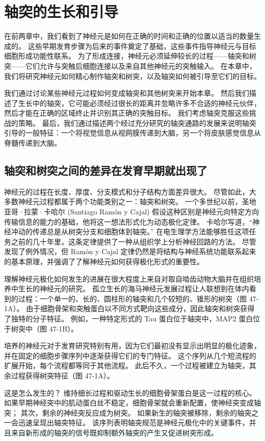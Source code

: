 \chapter{轴突的生长和引导}
在前两章中，我们看到了神经元是如何在正确的时间和正确的位置以适当的数量生成的。 这些早期发育步骤为后来的事件奠定了基础，这些事件指导神经元与目标细胞形成功能性联系。 为了形成连接，神经元必须延伸较长的过程——轴突和树突——它们允许与突触后细胞连接以及来自其他神经元的突触输入。 在本章中，我们将研究神经元如何精心制作轴突和树突，以及轴突如何被引导至它们的目标。

我们通过讨论某些神经元过程如何变成轴突和其他树突来开始本章。 然后我们描述了生长中的轴突，它可能必须经过很长的距离并忽略许多不合适的神经元伙伴，然后才能在正确的区域终止并识别其正确的突触目标。 我们考虑轴突克服这些挑战的策略。 最后，我们通过描述两个经过充分研究的轴突通路的发展来说明轴突引导的一般特征：一个将视觉信息从视网膜传递到大脑，另一个将皮肤感觉信息从脊髓传递到大脑。

\section{轴突和树突之间的差异在发育早期就出现了}

神经元的过程在长度、厚度、分支模式和分子结构方面差异很大。 尽管如此，大多数神经元过程都属于两个功能类别之一：轴突和树突。 一个多世纪以前，圣地亚哥·拉蒙·卡哈尔 (Santiago Ramón y Cajal) 假设这种区别是神经元向特定方向传输信息的能力的基础，他将这一想法形式化为动态极化定律。 卡哈尔写道，“神经冲动的传递总是从树突分支和细胞体到轴突。” 在电生理学方法能够胜任这项任务之前的几十年里，这条定律提供了一种从组织学上分析神经回路的方法。 尽管发现了例外情况，但 Ramón y Cajal 定律仍然是将结构与神经系统功能联系起来的基本原理，并强调了了解神经元如何获得极化形式的重要性。

理解神经元极化如何发生的进展在很大程度上来自对取自啮齿动物大脑并在组织培养中生长的神经元的研究。 孤立生长的海马神经元发展过程让人联想到在体内看到的过程：一个单一的、长的、圆柱形的轴突和几个较短的、锥形的树突（图 47-1A）。 由于细胞骨架和突触蛋白以不同方式靶向这些成分，因此轴突和树突获得了独特的分子特征。 例如，一种特定形式的 Tau 蛋白位于轴突中，MAP2 蛋白位于树突中（图 47-1B）。

培养的神经元对于发育研究特别有用，因为它们最初没有显示出明显的极化迹象，并在固定的细胞步骤序列中逐渐获得它们的专门特征。 这个序列从几个短流程的扩展开始，每个流程都等同于其他流程。 此后不久，一个过程被建立为轴突，其余过程获得树突特征（图 47-1A）。

这是怎么发生的？ 维持细长过程和驱动生长的细胞骨架蛋白是这一过程的核心。 如果早期神经突中的肌动蛋白丝不稳定，细胞骨架就会重新配置，使神经突变成轴突； 其次，剩余的神经突反应成为树突。 如果新生的轴突被移除，剩余的轴突之一会迅速呈现出轴突特征。 该序列表明轴突规范是神经元极化中的关键事件，并且来自新形成的轴突的信号既抑制额外轴突的产生又促进树突形成。

